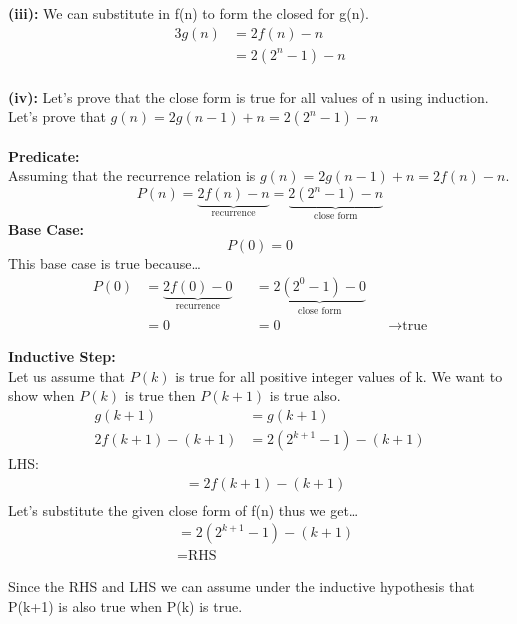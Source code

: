 \textbf{(iii):} 
We can substitute in f(n) to form the closed for g(n).
\begin{alignat*}{3}
    g(n) &= 2f(n)-n \\
         &= 2(2^n - 1)-n \\  
\end{alignat*}

\pagebreak

\textbf{(iv):} 
Let's prove that the close form is true for all values of n using induction. Let's prove that $g(n) = 2g(n - 1) + n = 2(2^n - 1)-n $
\\\\
\textbf{Predicate:}\\
Assuming that the recurrence relation is $g(n) = 2g(n - 1) + n  = 2f(n) - n$.
\[
  P(n) = \underbrace{2f(n)- n}_{\text{recurrence}}  = \underbrace{2(2^n - 1)-n}_{\text{close form}}
\]
\textbf{Base Case:} 
\[
  P(0) = 0
\]
This base case is true because\dots
\begin{align*}
    P(0) &= \underbrace{2f(0)- 0}_{\text{recurrence}} &&= \underbrace{2(2^0 - 1)-0}_{\text{close form}}\\
         &= 0 &&= 0 &&\rightarrow \text{true}
\end{align*}

\textbf{Inductive Step:}\\ 
Let us assume that $P(k)$ is true for all positive integer values of k. We want to show when $P(k)$ is true then $P(k+1)$ is true also.
\begin{align*}
 g(k+1) &= g(k+1)\\
 2f(k+1) - (k+1) &= 2(2^{k+1}-1) - (k + 1)
\end{align*}
LHS:
\begin{align*}
    &= 2f(k+1) - (k+1)\\
\end{align*}
Let's substitute the given close form of f(n) thus we get\dots
\begin{align*}
    &= 2(2^{k+1}-1) - (k+1)\\
    &=\text{RHS}
\end{align*}

Since the RHS and LHS we can assume under the inductive hypothesis that P(k+1) is also true when P(k) is true. 
